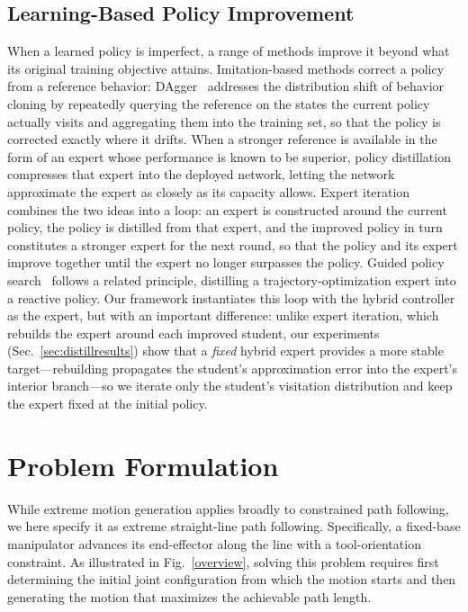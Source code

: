 \documentclass[journal, twoside]{IEEEtran}
\begin{document}
\subsection{Learning-Based Policy Improvement}
When a learned policy is imperfect, a range of methods improve it beyond what its original training objective attains. Imitation-based methods correct a policy from a reference behavior: DAgger~\cite{ross2011reduction} addresses the distribution shift of behavior cloning by repeatedly querying the reference on the states the current policy actually visits and aggregating them into the training set, so that the policy is corrected exactly where it drifts. When a stronger reference is available in the form of an expert whose performance is known to be superior, policy distillation~\cite{rusu2015policy} compresses that expert into the deployed network, letting the network approximate the expert as closely as its capacity allows. Expert iteration~\cite{anthony2017thinking} combines the two ideas into a loop: an expert is constructed around the current policy, the policy is distilled from that expert, and the improved policy in turn constitutes a stronger expert for the next round, so that the policy and its expert improve together until the expert no longer surpasses the policy. Guided policy search~\cite{levine2013guided} follows a related principle, distilling a trajectory-optimization expert into a reactive policy. Our framework instantiates this loop with the hybrid controller as the expert, but with an important difference: unlike expert iteration, which rebuilds the expert around each improved student, our experiments (Sec.~\ref{sec:distillresults}) show that a \emph{fixed} hybrid expert provides a more stable target---rebuilding propagates the student's approximation error into the expert's interior branch---so we iterate only the student's visitation distribution and keep the expert fixed at the initial policy.




\section{Problem Formulation}
While extreme motion generation applies broadly to constrained path following, we here specify it as extreme straight-line path following. Specifically, a fixed-base manipulator advances its end-effector along the line with a tool-orientation constraint. As illustrated in Fig.~\ref{overview}, solving this problem requires first determining the initial joint configuration from which the motion starts and then generating the motion that maximizes the achievable path length.
\end{document}
